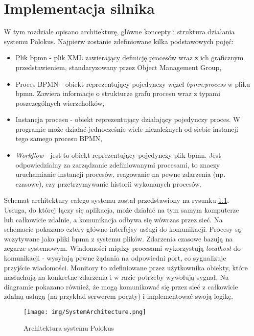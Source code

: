 \documentclass[declaration,shortabstract,mgr]{iithesis}
\newcommand{\bpmn}{BPMN }
\newcommand{\bpmnnospace}{BPMN}
\begin{document}
\chapter{Implementacja silnika}\label{chapter-implementation}
W tym rozdziale opisano architekturę, główne koncepty i struktura działania systemu Polokus. Najpierw zostanie zdefiniowane kilka podstawowych pojęć:
\begin{itemize}
    \setlength\itemsep{0em}
    \item Plik bpmn - plik XML zawierający definicję procesów wraz z ich graficznym przedstawieniem, standaryzowany przez Object Management Group,
    \item Proces \bpmn - obiekt reprezentujący pojedynczy węzeł \emph{bpmn:process} w pliku bpmn. Zawiera informacje o strukturze grafu procesu wraz z typami poszczególnych wierzchołków,
    \item Instancja procesu - obiekt reprezentujący działający pojedynczy proces. W programie może działać jednocześnie wiele niezależnych od siebie instancji tego samego procesu \bpmnnospace,
    \item \textit{Workflow} - jest to obiekt reprezentujący pojedynczy plik bpmn. Jest odpowiedzialny za zarządzanie zdefiniowanymi procesami, to znaczy uruchamianie instancji procesów, reagowanie na pewne zdarzenia (np. czasowe), czy przetrzymywanie historii wykonanych procesów.
\end{itemize}

Schemat architektury całego systemu został przedstawiony na rysunku \ref{fig:polokus-architecture}. Usługa, do której łączy się aplikacja, może działać na tym samym komputerze lub całkowicie zdalnie, a komunikacja odbywa się wówczas przez sieć. Na schemacie pokazano cztery główne interfejsy usługi do komunikacji. Procesy są wczytywane jako pliki bpmn z systemu plików. Zdarzenia czasowe bazują na zegarze systemowym. Wiadomości między procesami wykorzystują \textit{localhost} do komunikacji - wysyłają pewne żądania na odpowiedni port, co sygnalizuje przyjście wiadomości. Monitory to zdefiniowane przez użytkownika obiekty, które nasłuchują na konkretne zdarzenia i w razie potrzeby wywołują sygnał. Na diagramie pokazano również, że mogą komunikować się przez sieć z całkowicie zdalną usługą (na przykład serwerem poczty) i implementować swoją logikę.

\begin{figure}
    \texttt{[image: img/SystemArchitecture.png]}
    \caption{Architektura systemu Polokus}
    \label{fig:polokus-architecture}
\end{figure}
\end{document}
